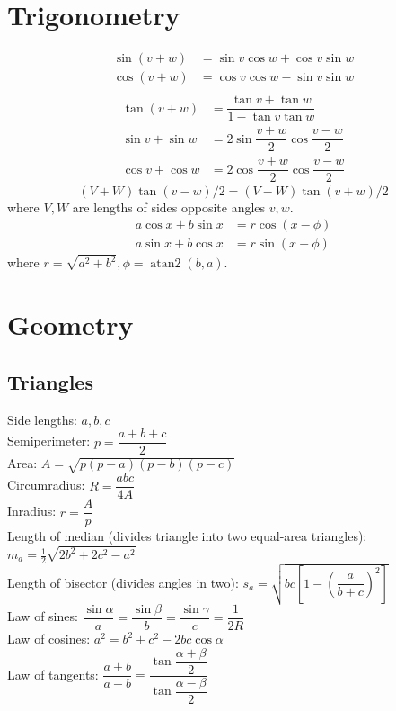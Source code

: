 \section{Trigonometry}
\begin{align*}
\sin(v+w)&{}=\sin v\cos w+\cos v\sin w\\
\cos(v+w)&{}=\cos v\cos w-\sin v\sin w\\
\end{align*}
\begin{align*}
\tan(v+w)&{}=\dfrac{\tan v+\tan w}{1-\tan v\tan w}\\
\sin v+\sin w&{}=2\sin\dfrac{v+w}{2}\cos\dfrac{v-w}{2}\\
\cos v+\cos w&{}=2\cos\dfrac{v+w}{2}\cos\dfrac{v-w}{2}
\end{align*}
\[ (V+W)\tan(v-w)/2{}=(V-W)\tan(v+w)/2 \]
where $V, W$ are lengths of sides opposite angles $v, w$.
\begin{align*}
	a\cos x+b\sin x&=r\cos(x-\phi)\\
	a\sin x+b\cos x&=r\sin(x+\phi)
\end{align*}
where $r=\sqrt{a^2+b^2}, \phi=\operatorname{atan2}(b,a)$.

\section{Geometry}

\subsection{Triangles}
Side lengths: $a,b,c$\\
Semiperimeter: $p=\dfrac{a+b+c}{2}$\\
Area: $A=\sqrt{p(p-a)(p-b)(p-c)}$\\
Circumradius: $R=\dfrac{abc}{4A}$\\
Inradius: $r=\dfrac{A}{p}$\\
Length of median (divides triangle into two equal-area triangles): $m_a=\tfrac{1}{2}\sqrt{2b^2+2c^2-a^2}$\\
Length of bisector (divides angles in two): $s_a=\sqrt{bc\left[1-\left(\dfrac{a}{b+c}\right)^2\right]}$\\
Law of sines: $\dfrac{\sin\alpha}{a}=\dfrac{\sin\beta}{b}=\dfrac{\sin\gamma}{c}=\dfrac{1}{2R}$\\
Law of cosines: $a^2=b^2+c^2-2bc\cos\alpha$\\
Law of tangents: $\dfrac{a+b}{a-b}=\dfrac{\tan\dfrac{\alpha+\beta}{2}}{\tan\dfrac{\alpha-\beta}{2}}$\\

